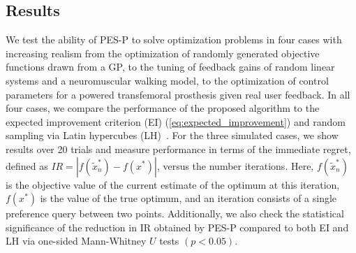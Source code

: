 \subsection{Results}\label{s:results}
We test the ability of PES-P to solve optimization problems in four cases with
increasing realism from the optimization of randomly generated objective
functions drawn from a GP, to the tuning of feedback gains of random linear
systems and a neuromuscular walking model, to the optimization of control
parameters for a powered transfemoral prosthesis given real user feedback. In
all four cases, we compare the performance of the proposed algorithm to the
expected improvement criterion (EI) (\cref{eq:expected_improvement}) and random
sampling via Latin hypercubes (LH)~\citep{mckay2000comparison}. For the three simulated
cases, we show results over 20 trials and measure performance in terms of the
immediate regret, defined as $IR = |f(\tilde x_n^*) - f(x^*)|$, versus the
number iterations.  Here, $f(\tilde x_n^*)$ is the objective value of the
current estimate of the optimum at this iteration, $f(x^*)$ is the value of the
true optimum, and an iteration consists of a single preference query between two
points.  Additionally, we also check the statistical significance of the
reduction in IR obtained by PES-P compared to both EI and LH via one-sided
Mann-Whitney $U$ tests $(p < 0.05)$.

